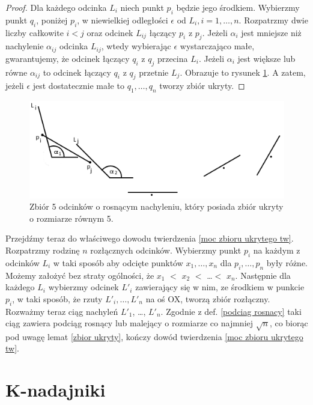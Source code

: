 \documentclass[brudnopis]{xmgr}
\theoremstyle{definition}
\begin{document}
\begin{proof}
	Dla każdego odcinka $L_i$ niech punkt $p_i$ będzie jego środkiem. Wybierzmy punkt $q_i$, poniżej $p_i$, w niewielkiej odległości $\epsilon$ od $L_i, i = 1,\ldots,n$. Rozpatrzmy dwie liczby całkowite $i < j$ oraz odcinek $L_{ij}$ łączący $p_i$ z $p_j$. Jeżeli $\alpha_i$ jest mniejsze niż nachylenie $\alpha_{ij}$ odcinka $L_{ij}$, wtedy wybierając $\epsilon$ wystarczająco małe, gwarantujemy, że odcinek łączący $q_i$ z $q_j$ przecina $L_i$. Jeżeli $\alpha_i$ jest większe lub równe $\alpha_{ij}$ to odcinek łączący $q_i$ z $q_j$ przetnie $L_j$. Obrazuje to rysunek \ref{fig:5 zbior ukryty}. A zatem, jeżeli $\epsilon$ jest dostatecznie małe to  $q_1, \ldots, q_n$ tworzy zbiór ukryty. 
\end{proof}
\begin{figure}[ht!]
  \centering
   \includegraphics{rysunki/5_odcinkow_zbior_ukryty.png}
   \caption{Zbiór 5 odcinków o rosnącym nachyleniu, który posiada zbiór ukryty o rozmiarze równym 5.}
   \label{fig:5 zbior ukryty}
\end{figure}
\indent Przejdźmy teraz do właściwego dowodu twierdzenia \ref{moc zbioru ukrytego tw}. Rozpatrzmy rodzinę $n$ rozłącznych odcinków. Wybierzmy punkt $p_i$ na każdym z odcinków $L_i$ w taki sposób aby odcięte punktów $x_1,\ldots, x_n$ dla $p_i,\ldots,p_n$ były różne. Możemy założyć bez straty ogólności, że $x_1$ $<$ $x_2$ $<$ \ldots $<$ $x_n$. Następnie dla każdego $L_i$ wybierzmy odcinek $L'_i$ zawierający się w nim, ze środkiem w punkcie $p_i$, w taki sposób, że rzuty $L'_i,\ldots,L'_n$ na oś OX, tworzą zbiór rozłączny. Rozważmy teraz ciąg nachyleń $L'_1$, \ldots, $L'_n$. Zgodnie z def. \ref{podciag rosnacy} taki ciąg zawiera podciąg rosnący lub malejący o rozmiarze co najmniej $\sqrt{n}$, co biorąc pod uwagę lemat \ref{zbior ukryty}, kończy dowód twierdzenia \ref{moc zbioru ukrytego tw}.

\chapter{K-nadajniki}
\end{document}
